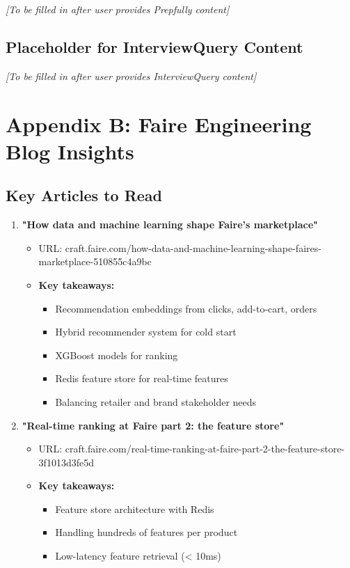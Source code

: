 \documentclass[11pt,letterpaper]{article}
\begin{document}
\textit{[To be filled in after user provides Prepfully content]}

\subsection{Placeholder for InterviewQuery Content}

\textit{[To be filled in after user provides InterviewQuery content]}

\section{Appendix B: Faire Engineering Blog Insights}

\subsection{Key Articles to Read}

\begin{enumerate}
    \item \textbf{"How data and machine learning shape Faire's marketplace"}
    \begin{itemize}
        \item URL: craft.faire.com/how-data-and-machine-learning-shape-faires-marketplace-510855c4a9bc
        \item \textbf{Key takeaways:}
        \begin{itemize}
            \item Recommendation embeddings from clicks, add-to-cart, orders
            \item Hybrid recommender system for cold start
            \item XGBoost models for ranking
            \item Redis feature store for real-time features
            \item Balancing retailer and brand stakeholder needs
        \end{itemize}
    \end{itemize}

    \item \textbf{"Real-time ranking at Faire part 2: the feature store"}
    \begin{itemize}
        \item URL: craft.faire.com/real-time-ranking-at-faire-part-2-the-feature-store-3f1013d3fe5d
        \item \textbf{Key takeaways:}
        \begin{itemize}
            \item Feature store architecture with Redis
            \item Handling hundreds of features per product
            \item Low-latency feature retrieval (< 10ms)
        \end{itemize}
    \end{itemize}
\end{enumerate}
\end{document}
